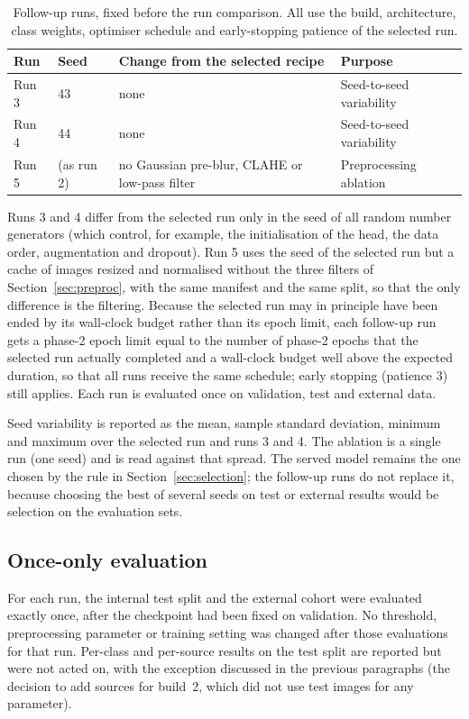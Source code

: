 \begin{table}[t]
\centering
\caption{Follow-up runs, fixed before the run comparison. All use the build, architecture, class weights, optimiser schedule and early-stopping patience of the selected run.}
\label{tab:followup}
\small
\begin{tabular}{@{}llll@{}}
\toprule
Run & Seed & Change from the selected recipe & Purpose \\
\midrule
Run 3 & 43 & none & Seed-to-seed variability \\
Run 4 & 44 & none & Seed-to-seed variability \\
Run 5 & \RSeed{} (as run 2) & no Gaussian pre-blur, CLAHE or low-pass filter & Preprocessing ablation \\
\bottomrule
\end{tabular}
\end{table}

Runs 3 and 4 differ from the selected run only in the seed of all random number generators (which control, for example, the initialisation of the head, the data order, augmentation and dropout). Run 5 uses the seed of the selected run but a cache of images resized and normalised without the three filters of Section~\ref{sec:preproc}, with the same manifest and the same split, so that the only difference is the filtering. Because the selected run may in principle have been ended by its wall-clock budget rather than its epoch limit, each follow-up run gets a phase-2 epoch limit equal to the number of phase-2 epochs that the selected run actually completed and a wall-clock budget well above the expected duration, so that all runs receive the same schedule; early stopping (patience 3) still applies. Each run is evaluated once on validation, test and external data.

Seed variability is reported as the mean, sample standard deviation, minimum and maximum over the selected run and runs 3 and 4. The ablation is a single run (one seed) and is read against that spread. The served model remains the one chosen by the rule in Section~\ref{sec:selection}; the follow-up runs do not replace it, because choosing the best of several seeds on test or external results would be selection on the evaluation sets.

\subsection{Once-only evaluation}
For each run, the internal test split and the external cohort were evaluated exactly once, after the checkpoint had been fixed on validation. No threshold, preprocessing parameter or training setting was changed after those evaluations for that run. Per-class and per-source results on the test split are reported but were not acted on, with the exception discussed in the previous paragraphs (the decision to add sources for build~2, which did not use test images for any parameter).

